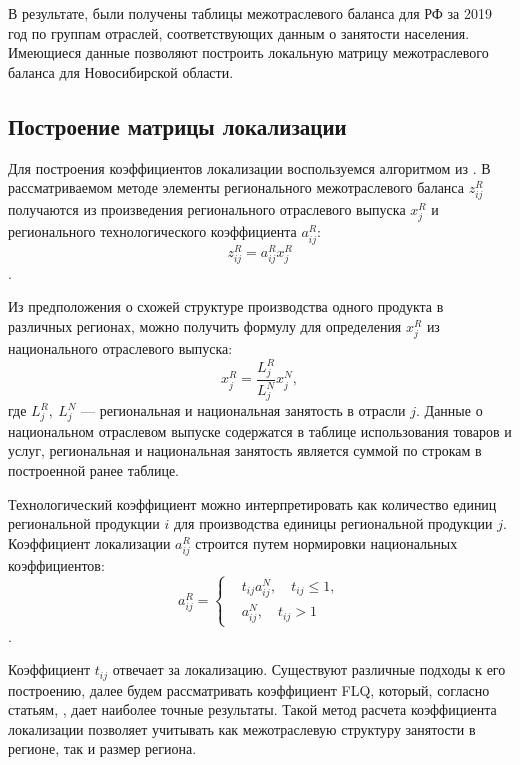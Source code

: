 \documentclass[12pt, a4paper]{article}
\begin{document}
В результате, были получены таблицы межотраслевого баланса для РФ за 2019 год по группам отраслей, соответствующих данным о занятости населения. Имеющиеся данные позволяют построить локальную матрицу межотраслевого баланса для Новосибирской области.

\subsection{Построение матрицы локализации}

Для построения коэффициентов локализации воспользуемся алгоритмом из 
\cite{PonomEvdok}. 
В рассматриваемом методе элементы регионального межотраслевого баланса $z_{ij}^R$ получаются из произведения регионального отраслевого выпуска $x_j^R$ и регионального технологического коэффициента $a_{ij}^R$: $$z^R_{ij} = a^R_{ij} x_j^R$$. 

Из предположения о схожей структуре производства одного продукта в различных регионах, можно получить формулу для определения $x_{j}^R$ из национального отраслевого выпуска:
$$
x_j^R = \dfrac{L_j^R}{L_j^N}x_j^N,
$$
где $L_j^R,\ L_j^N$ --- региональная и национальная занятость в отрасли $j$. Данные о национальном отраслевом выпуске содержатся в таблице использования товаров и услуг, региональная и национальная занятость является суммой по строкам в построенной ранее таблице.

Технологический коэффициент можно интерпретировать как количество единиц региональной продукции $i$ для производства единицы региональной продукции $j$. 
Коэффициент локализации $a_{ij}^R$ строится путем нормировки национальных коэффициентов: 
$$a_{ij}^R = \left\{ \begin{aligned}&t_{ij}a_{ij}^N,\quad t_{ij} \leqslant 1,\\&a_{ij}^N,\quad t_{ij} > 1\end{aligned}\right.$$. 

Коэффициент $t_{ij}$ отвечает за локализацию. Существуют различные подходы к его построению, далее будем рассматривать коэффициент FLQ, который, согласно статьям, 
\cite{Kronenberg}, \cite{Bonfiglio} 
дает наиболее точные результаты. Такой метод расчета коэффициента локализации позволяет учитывать как межотраслевую структуру занятости в регионе, так и размер региона.
\end{document}
